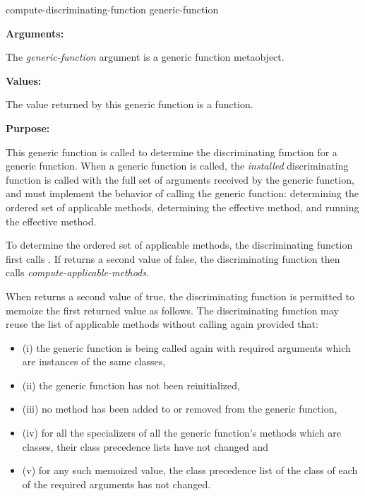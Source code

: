 \begin{defun}
compute-discriminating-function generic-function

\textbf{Arguments:}

The \emph{generic-function} argument is a generic function metaobject.

\textbf{Values:}

The value returned by this generic function is a function.

\textbf{Purpose:}

This generic function is called to determine the discriminating function for a
generic function. When a generic function is called, the \emph{installed}
discriminating function is called with the full set of arguments received by the
generic function, and must implement the behavior of calling the generic
function: determining the ordered set of applicable methods, determining the
effective method, and running the effective method.

To determine the ordered set of applicable methods, the discriminating function
first calls . If
 returns a second value of false, the
discriminating function then calls \emph{compute-applicable-methods}. 

When  returns a second value of true,
the discriminating function is permitted to memoize the first returned value as
follows. The discriminating function may reuse the list of applicable methods
without calling  again provided that: 

\begin{itemize}
\item (i) the generic function is being called again with required arguments
  which are instances of the same classes,
\item (ii) the generic function has not been reinitialized,
\item (iii) no method has been added to or removed from the generic function,
\item (iv) for all the specializers of all the generic function's methods which
  are classes, their class precedence lists have not changed and
\item (v) for any such memoized value, the class precedence list of the class of
  each of the required arguments has not changed.
\end{itemize}
  

\end{defun}

